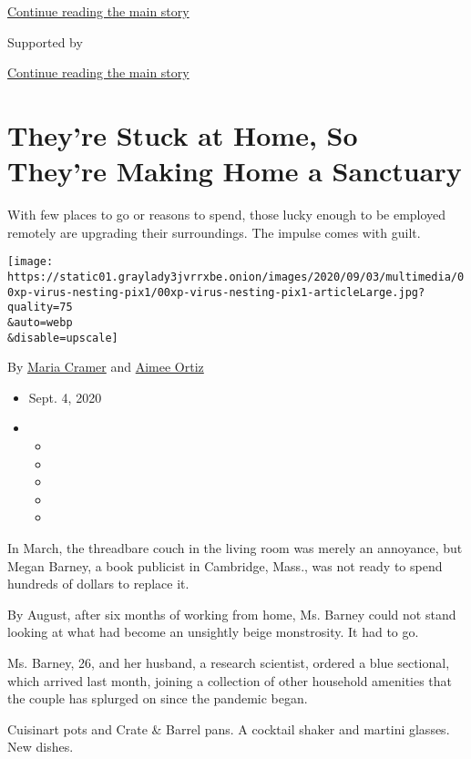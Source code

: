 \protect\hyperlink{after-top}{Continue reading the main story}

Supported by

\protect\hyperlink{after-sponsor}{Continue reading the main story}

\hypertarget{theyre-stuck-at-home-so-theyre-making-home-a-sanctuary}{%
\section{They're Stuck at Home, So They're Making Home a
Sanctuary}\label{theyre-stuck-at-home-so-theyre-making-home-a-sanctuary}}

With few places to go or reasons to spend, those lucky enough to be
employed remotely are upgrading their surroundings. The impulse comes
with guilt.

\texttt{[image: https://static01.graylady3jvrrxbe.onion/images/2020/09/03/multimedia/00xp-virus-nesting-pix1/00xp-virus-nesting-pix1-articleLarge.jpg?quality=75\\\&auto=webp\\\&disable=upscale]}

By \href{https://www.nytimes3xbfgragh.onion/by/maria-cramer}{Maria
Cramer} and
\href{https://www.nytimes3xbfgragh.onion/by/aimee-ortiz}{Aimee Ortiz}

\begin{itemize}
\item
  Sept. 4, 2020
\item
  \begin{itemize}
  \item
  \item
  \item
  \item
  \item
  \end{itemize}
\end{itemize}

In March, the threadbare couch in the living room was merely an
annoyance, but Megan Barney, a book publicist in Cambridge, Mass., was
not ready to spend hundreds of dollars to replace it.

By August, after six months of working from home, Ms. Barney could not
stand looking at what had become an unsightly beige monstrosity. It had
to go.

Ms. Barney, 26, and her husband, a research scientist, ordered a blue
sectional, which arrived last month, joining a collection of other
household amenities that the couple has splurged on since the pandemic
began.

Cuisinart pots and Crate \& Barrel pans. A cocktail shaker and martini
glasses. New dishes.


